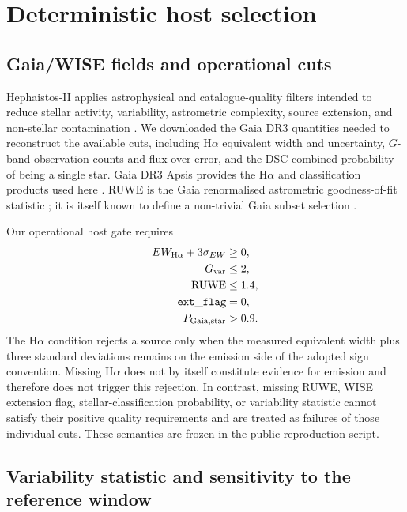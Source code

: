 \documentclass[fleqn,usenatbib]{mnras}
\begin{document}
\section{Deterministic host selection}
\label{sec:hostcuts}

\subsection{Gaia/WISE fields and operational cuts}

Hephaistos-II applies astrophysical and catalogue-quality filters intended to reduce stellar activity, variability, astrometric complexity, source extension, and non-stellar contamination \citep{Suazo2024}. We downloaded the Gaia DR3 quantities needed to reconstruct the available cuts, including H$\alpha$ equivalent width and uncertainty, $G$-band observation counts and flux-over-error, and the DSC combined probability of being a single star. Gaia DR3 Apsis provides the H$\alpha$ and classification products used here \citep{Creevey2023}. RUWE is the Gaia renormalised astrometric goodness-of-fit statistic \citep{Lindegren2021}; it is itself known to define a non-trivial Gaia subset selection \citep{EverallBoubert2022}.

Our operational host gate requires
\begin{align}
EW_{{\rm H}\alpha}+3\sigma_{EW}&\ge0,\\
G_{\rm var}&\le2,\\
{\rm RUWE}&\le1.4,\\
{\tt ext\_flag}&=0,\\
P_{\rm Gaia,star}&>0.9.
\end{align}
The H$\alpha$ condition rejects a source only when the measured equivalent width plus three standard deviations remains on the emission side of the adopted sign convention. Missing H$\alpha$ does not by itself constitute evidence for emission and therefore does not trigger this rejection. In contrast, missing RUWE, WISE extension flag, stellar-classification probability, or variability statistic cannot satisfy their positive quality requirements and are treated as failures of those individual cuts. These semantics are frozen in the public reproduction script.

\subsection{Variability statistic and sensitivity to the reference window}
\end{document}
